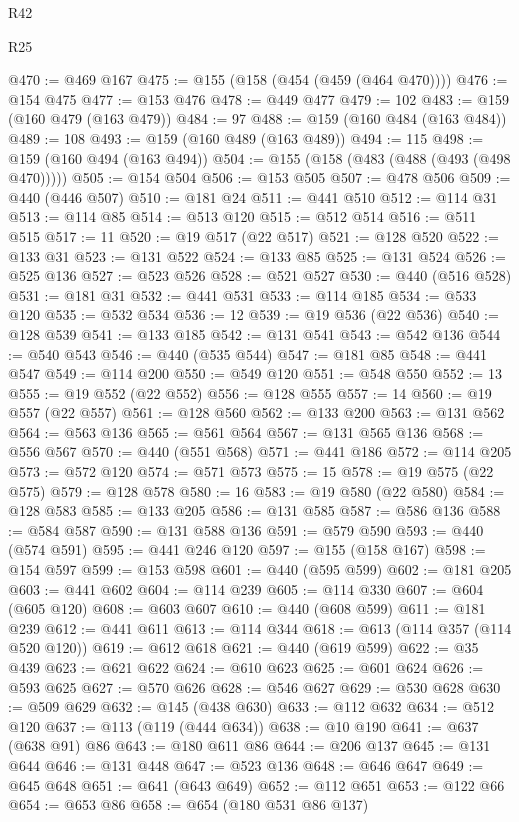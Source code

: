 \begin{lexlean}{R42}
\begin{lexlean}{R25}
\begin{coremodule}
{{{{{{{{{{{{{{{{{{{{{{{{{{{{{{{{{{{{{{{{{{{{{{{{{{{{{{{{{{{{{{{{{{{{{{{{{{{{{{{{{{{{{{{{{{{{{{{{{{{{{{{{{{{{{{{{{{{{{{{{{{{{{{{{{{{{{{{{{{{{{{{{{{{{{{{{{{{{{{{{{{{{{{{{{{{{{{{{{{{{{{{{{{{{{{{{{{{{{{{@470 := @469 @167
@475 := @155 (@158 (@454 (@459 (@464 @470))))
@476 := @154 @475
@477 := @153 @476
@478 := @449 @477
@479 := 102
@483 := @159 (@160 @479 (@163 @479))
@484 := 97
@488 := @159 (@160 @484 (@163 @484))
@489 := 108
@493 := @159 (@160 @489 (@163 @489))
@494 := 115
@498 := @159 (@160 @494 (@163 @494))
@504 := @155 (@158 (@483 (@488 (@493 (@498 @470)))))
@505 := @154 @504
@506 := @153 @505
@507 := @478 @506
@509 := @440 (@446 @507)
@510 := @181 @24
@511 := @441 @510
@512 := @114 @31
@513 := @114 @85
@514 := @513 @120
@515 := @512 @514
@516 := @511 @515
@517 := 11
@520 := @19 @517 (@22 @517)
@521 := @128 @520
@522 := @133 @31
@523 := @131 @522
@524 := @133 @85
@525 := @131 @524
@526 := @525 @136
@527 := @523 @526
@528 := @521 @527
@530 := @440 (@516 @528)
@531 := @181 @31
@532 := @441 @531
@533 := @114 @185
@534 := @533 @120
@535 := @532 @534
@536 := 12
@539 := @19 @536 (@22 @536)
@540 := @128 @539
@541 := @133 @185
@542 := @131 @541
@543 := @542 @136
@544 := @540 @543
@546 := @440 (@535 @544)
@547 := @181 @85
@548 := @441 @547
@549 := @114 @200
@550 := @549 @120
@551 := @548 @550
@552 := 13
@555 := @19 @552 (@22 @552)
@556 := @128 @555
@557 := 14
@560 := @19 @557 (@22 @557)
@561 := @128 @560
@562 := @133 @200
@563 := @131 @562
@564 := @563 @136
@565 := @561 @564
@567 := @131 @565 @136
@568 := @556 @567
@570 := @440 (@551 @568)
@571 := @441 @186
@572 := @114 @205
@573 := @572 @120
@574 := @571 @573
@575 := 15
@578 := @19 @575 (@22 @575)
@579 := @128 @578
@580 := 16
@583 := @19 @580 (@22 @580)
@584 := @128 @583
@585 := @133 @205
@586 := @131 @585
@587 := @586 @136
@588 := @584 @587
@590 := @131 @588 @136
@591 := @579 @590
@593 := @440 (@574 @591)
@595 := @441 @246 @120
@597 := @155 (@158 @167)
@598 := @154 @597
@599 := @153 @598
@601 := @440 (@595 @599)
@602 := @181 @205
@603 := @441 @602
@604 := @114 @239
@605 := @114 @330
@607 := @604 (@605 @120)
@608 := @603 @607
@610 := @440 (@608 @599)
@611 := @181 @239
@612 := @441 @611
@613 := @114 @344
@618 := @613 (@114 @357 (@114 @520 @120))
@619 := @612 @618
@621 := @440 (@619 @599)
@622 := @35 @439
@623 := @621 @622
@624 := @610 @623
@625 := @601 @624
@626 := @593 @625
@627 := @570 @626
@628 := @546 @627
@629 := @530 @628
@630 := @509 @629
@632 := @145 (@438 @630)
@633 := @112 @632
@634 := @512 @120
@637 := @113 (@119 (@444 @634))
@638 := @10 @190
@641 := @637 (@638 @91) @86
@643 := @180 @611 @86
@644 := @206 @137
@645 := @131 @644
@646 := @131 @448
@647 := @523 @136
@648 := @646 @647
@649 := @645 @648
@651 := @641 (@643 @649)
@652 := @112 @651
@653 := @122 @66
@654 := @653 @86
@658 := @654 (@180 @531 @86 @137)
}}}}}}}}}}}}}}}}}}}}}}}}}}}}}}}}}}}}}}}}}}}}}}}}}}}}}}}}}}}}}}}}}}}}}}}}}}}}}}}}}}}}}}}}}}}}}}}}}}}}}}}}}}}}}}}}}}}}}}}}}}}}}}}}}}}}}}}}}}}}}}}}}}}}}}}}}}}}}}}}}}}}}}}}}}}}}}}}}}}}}}}}}}}}}}}}}}}}}}}
\end{coremodule}
\end{lexlean}
\end{lexlean}

